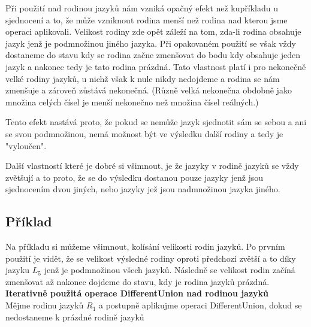 Při použití nad rodinou jazyků nám vzniká opačný efekt než kupříkladu u sjednocení a to, že může vzniknout rodina menší než rodina nad kterou jsme operaci aplikovali. Velikost rodiny zde opět záleží na tom, zda-li rodina obsahuje jazyk jenž je podmnožinou jiného jazyka. Při opakovaném použití se však vždy dostaneme do stavu kdy se rodina začne zmenšovat do bodu kdy obsahuje jeden jazyk a nakonec tedy je tato rodina prázdná. Tato vlastnost platí i pro nekonečně velké rodiny jazyků, u nichž však k nule nikdy nedojdeme a rodina se nám zmenšuje a zároveň zůstává nekonečná. (Různě velká nekonečna obdobně jako množina celých čísel je menší nekonečno než množina čísel reálných.)

Tento efekt nastává proto, že pokud se nemůže jazyk sjednotit sám se sebou a ani se svou podmnožinou, nemá možnost být ve výsledku další rodiny a tedy je "vyloučen".

Další vlastností které je dobré si všimnout, je že jazyky v rodině jazyků se vždy zvětšují a to proto, že se do výsledku dostanou pouze jazyky jenž jsou sjednocením dvou jiných, nebo jazyky jež jsou nadmnožinou jazyka jiného.

\subsection{Příklad}
Na příkladu si můžeme všimnout, kolísání velikosti rodin jazyků. Po prvním použití je vidět, že se velikost výsledné rodiny oproti předchozí zvětší a to díky jazyku $L_{5}$ jenž je podmnožinou všech jazyků. Následně se velikost rodin začíná zmenšovat až nakonec dojdeme do stavu, kdy je rodina jazyků prázdná.\\


\textbf{Iterativně použitá operace DifferentUnion nad rodinou jazyků}\\
Mějme rodinu jazyků $R_{1}$ a postupně aplikujme operaci DifferentUnion, dokud se nedostaneme k prázdné rodině jazyků

